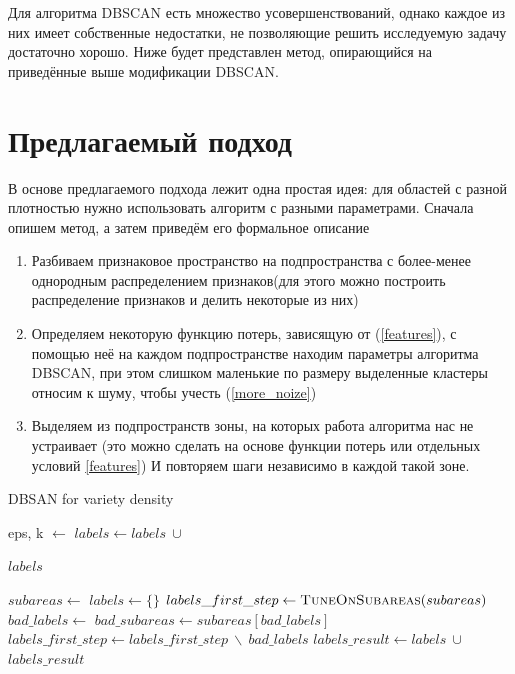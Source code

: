 \documentclass[12pt,fleqn]{article}
\begin{document}
Для алгоритма DBSCAN есть множество усовершенствований, однако каждое из них имеет собственные недостатки, не позволяющие решить исследуемую задачу достаточно хорошо. Ниже будет представлен метод, опирающийся на приведённые выше модификации  DBSCAN.

\section{Предлагаемый подход}
В основе предлагаемого подхода лежит одна простая идея: для областей с разной плотностью нужно использовать алгоритм с разными параметрами. Сначала опишем метод, а затем приведём его формальное описание
\begin{enumerate} 
    \item Разбиваем признаковое пространство на подпространства с более-менее однородным распределением признаков(для этого можно построить распределение признаков и делить некоторые из них) 
    \item  Определяем некоторую функцию потерь, зависящую от (\ref{features}), с помощью неё на каждом подпространстве находим параметры алгоритма DBSCAN, при этом слишком маленькие по размеру выделенные кластеры относим к шуму, чтобы учесть (\ref{more_noize})
    \item Выделяем из подпространств зоны, на которых работа алгоритма нас не устраивает (это можно сделать на основе функции потерь или отдельных условий \ref{features}) И повторяем шаги независимо в каждой такой зоне.
\end{enumerate} 

\newpage

\begin{algorithm}
\caption{DBSAN for variety density}\label{alg:Example}
\begin{algorithmic}

    \State eps, k  $\gets$ 
    \State $labels \gets labels ~ \cup$ 
\EndFor

\State \Return $labels$
\EndFunction

\State $subareas \gets$ 
\State $labels \gets \{\}$ 
\State $labels\_first\_step \gets \Call{TuneOnSubareas}{subareas}$
\State $bad\_labels \gets$ 
\State $bad\_subareas \gets subareas[ bad\_labels ]$
\State $labels\_first\_step \gets labels\_first\_step~\backslash~bad\_labels$
\State $labels\_result \gets labels ~ \cup$ 
\State \Return $labels\_result$

\end{algorithmic}
\end{algorithm}
\end{document}
